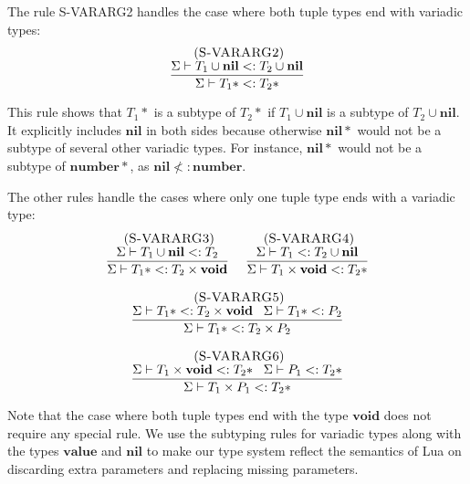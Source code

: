 \documentclass{sigplanconf}
\newcommand{\Value}{\mathbf{value}}
\newcommand{\Nil}{\mathbf{nil}}
\newcommand{\Number}{\mathbf{number}}
\newcommand{\Void}{\mathbf{void}}
\newcommand{\mylabel}[1]{\; (\textsc{#1})}
\newcommand{\senv}{\Sigma}
\newcommand{\subtype}{<:}
\begin{document}
The rule \textsc{S-VARARG2} handles the case where both tuple types end
with variadic types:
\[
\begin{array}{c}
\mylabel{S-VARARG2}\\
\dfrac{\senv \vdash T_{1} \cup \Nil \subtype T_{2} \cup \Nil}
      {\senv \vdash T_{1}{*} \subtype T_{2}{*}}
\end{array}
\]

This rule shows that $T_{1}{*}$ is a subtype of $T_{2}{*}$
if $T_{1} \cup \Nil$ is a subtype of $T_{2} \cup \Nil$.
It explicitly includes $\Nil$ in both sides because otherwise
$\Nil{*}$ would not be a subtype of several other variadic types.
For instance, $\Nil{*}$ would not be a subtype of $\Number{*}$,
as $\Nil \not\subtype \Number$.

The other rules handle the cases where only one tuple type ends with a variadic type:
\[
\begin{array}{c}
\begin{array}{c}
\mylabel{S-VARARG3}\\
\dfrac{\senv \vdash T_{1} \cup \Nil \subtype T_{2}}
      {\senv \vdash T_{1}{*} \subtype T_{2} \times \Void}
\end{array}
\;
\begin{array}{c}
\mylabel{S-VARARG4}\\
\dfrac{\senv \vdash T_{1} \subtype T_{2} \cup \Nil}
      {\senv \vdash T_{1} \times \Void \subtype T_{2}{*}}
\end{array}
\\ \\
\begin{array}{c}
\mylabel{S-VARARG5}\\
\dfrac{\senv \vdash T_{1}{*} \subtype T_{2} \times \Void \;\;\;
       \senv \vdash T_{1}{*} \subtype P_{2}}
      {\senv \vdash T_{1}{*} \subtype T_{2} \times P_{2}}
\end{array}
\\ \\
\begin{array}{c}
\mylabel{S-VARARG6}\\
\dfrac{\senv \vdash T_{1} \times \Void \subtype T_{2}{*} \;\;\;
       \senv \vdash P_{1} \subtype T_{2}{*}}
      {\senv \vdash T_{1} \times P_{1} \subtype T_{2}{*}}
\end{array}
\end{array}
\]

Note that the case where both tuple types end with the type $\Void$ does
not require any special rule.
We use the subtyping rules for variadic types along with the types
$\Value$ and $\Nil$ to make our type system reflect the semantics of
Lua on discarding extra parameters and replacing missing parameters.
\end{document}
